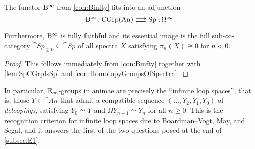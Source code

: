 \begin{cor}
	The functor $\mathrm{B}^\infty$ from \cref{con:Binfty} fits into an adjunction
	\begin{equation*}
		\B^\infty\colon \cat{CGrp}(\cat{An})\doublelrmorphism \cat{Sp}\noloc \Omega^\infty\,.
	\end{equation*}
	Furthermore, $\mathrm{B}^\infty$ is fully faithful and its essential image is the full sub-$\infty$-category $\cat{Sp}_{\geqslant 0}\subseteq\cat{Sp}$ of all spectra $X$ satisfying $\pi_n(X)\cong 0$ for $n<0$.
\end{cor}
\begin{proof}
	This follows immediately from \cref{con:Binfty} together with \cref{lem:SpCGrpIsSp} and \cref{con:HomotopyGroupsOfSpectra}.
\end{proof}

In particular, $\mathbb{E}_\infty$-groups in animae are precisely the \enquote{infinite loop spaces}, that is, those $Y\in\cat{An}$ that admit a compatible sequence $(\dotsc,Y_2,Y_1,Y_0)$ of \emph{deloopings}, satisfying $Y_0\simeq Y$ and $\Omega Y_{n+1}\simeq Y_n$ for all $n\geqslant 0$. This is the recognition criterion for infinite loop spaces due to Boardman--Vogt, May, and Segal, and it answers the first of the two questions posed at the end of \cref{subsec:E1}.
